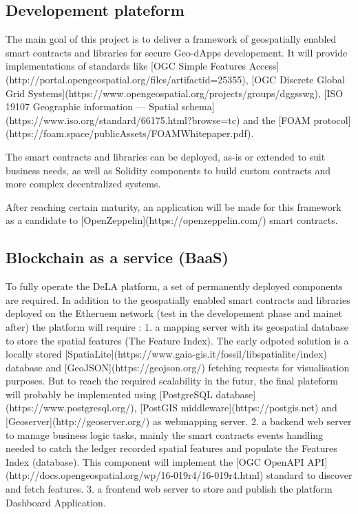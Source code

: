 \documentclass{isprs} %
\begin{document}
\subsection{Developement plateform}\label{sec:Developement plateform}

The main goal of this project is to deliver a framework of geospatially enabled smart contracts and libraries for secure Geo-dApps developement. It will provide implementations of standards like [OGC Simple Features Access](http://portal.opengeospatial.org/files/artifactid=25355), [OGC Discrete Global Grid Systems](https://www.opengeospatial.org/projects/groups/dggsswg), [ISO 19107 Geographic information — Spatial schema](https://www.iso.org/standard/66175.html?browse=tc) and the [FOAM protocol](https://foam.space/publicAssets/FOAMWhitepaper.pdf).

The smart contracts and libraries can be deployed, as-is or extended to suit business needs, as well as Solidity components to build custom contracts and more complex decentralized systems. 

After reaching certain maturity, an  application will be made for this framework as a candidate to [OpenZeppelin](https://openzeppelin.com/) smart contracts.

\subsection{Blockchain as a service (BaaS)}\label{sec:Blockchain as a service (BaaS)}

To fully operate the DeLA platform, a set of permanently deployed components are required. In addition to the geospatially enabled smart contracts and libraries deployed on the Etheruem network (test in the developement phase and mainet after) the platform will require : 
1. a mapping server with its geospatial database to store the spatial features (The Feature Index). The early odpoted solution is a locally stored [SpatiaLite](https://www.gaia-gis.it/fossil/libspatialite/index) database and [GeoJSON](https://geojson.org/) fetching requests for visualisation purposes. But to reach the required scalability in the futur, the final plateform will probably be implemented using [PostgreSQL database](https://www.postgresql.org/), [PostGIS middleware](https://postgis.net) and [Geoserver](http://geoserver.org/) as webmapping server.  
2. a backend web server to manage business logic tasks, mainly the smart contracts events handling needed to catch the ledger recorded spatial features and populate the Features Index (database). This component will implement the [OGC OpenAPI API](http://docs.opengeospatial.org/wp/16-019r4/16-019r4.html) standard to discover and fetch features.
3. a frontend web server to store and publish the platform Dashboard Application. 
\end{document}
